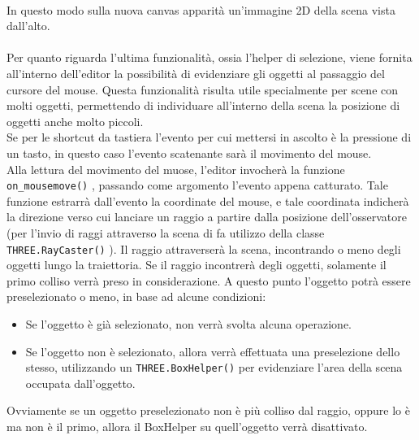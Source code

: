 \\ 
In questo modo sulla nuova canvas apparità un’immagine 2D della scena vista dall’alto.
\\
\\
Per quanto riguarda l’ultima funzionalità, ossia l’helper di selezione, viene fornita all’interno dell’editor la possibilità di evidenziare gli oggetti al passaggio del cursore del mouse. Questa funzionalità risulta utile specialmente per scene con molti oggetti, permettendo di individuare all’interno della scena la posizione di oggetti anche molto piccoli.
\\
Se per le shortcut da tastiera l’evento per cui mettersi in ascolto è la pressione di un tasto, in questo caso l’evento scatenante sarà il movimento del mouse.
\\
Alla lettura del movimento del muose, l’editor invocherà la funzione \texttt{on\_mousemove()} , passando come argomento l’evento appena catturato. Tale funzione estrarrà dall’evento la coordinate del mouse, e tale coordinata indicherà la direzione verso cui lanciare un raggio a partire dalla posizione dell’osservatore (per l’invio di raggi attraverso la scena di fa utilizzo della classe \texttt{THREE.RayCaster()} ). Il raggio attraverserà la scena, incontrando o meno degli oggetti lungo la traiettoria. Se il raggio incontrerà degli oggetti, solamente il primo colliso verrà preso in considerazione. A questo punto l’oggetto potrà essere preselezionato o meno, in base ad alcune condizioni:
\begin{itemize}
\item Se l’oggetto è già selezionato, non verrà svolta alcuna operazione.
\item Se l’oggetto non è selezionato, allora verrà effettuata una preselezione dello stesso, utilizzando un \texttt{THREE.BoxHelper()} per evidenziare l’area della scena occupata dall’oggetto.  
\end{itemize}
Ovviamente se un oggetto preselezionato non è più colliso dal raggio, oppure lo è ma non è il primo, allora il BoxHelper su quell’oggetto verrà disattivato. 